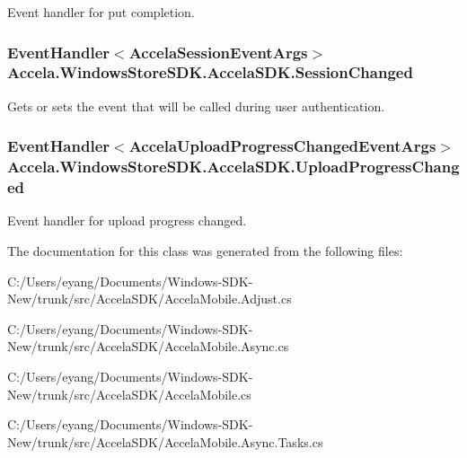 Event handler for put completion. 

\hypertarget{class_accela_1_1_windows_store_s_d_k_1_1_accela_s_d_k_a9217603b8d65f3b1424073df8c69dd1d}{
\subsubsection[{Session\+Changed}]{\setlength{\rightskip}{0pt plus 5cm}Event\+Handler$<${\bf Accela\+Session\+Event\+Args}$>$ Accela.\+Windows\+Store\+S\+D\+K.\+Accela\+S\+D\+K.\+Session\+Changed}}\label{class_accela_1_1_windows_store_s_d_k_1_1_accela_s_d_k_a9217603b8d65f3b1424073df8c69dd1d}


Gets or sets the event that will be called during user authentication. 

\hypertarget{class_accela_1_1_windows_store_s_d_k_1_1_accela_s_d_k_a724988be0528fd8b906ef1bdd49571d7}{
\subsubsection[{Upload\+Progress\+Changed}]{\setlength{\rightskip}{0pt plus 5cm}Event\+Handler$<${\bf Accela\+Upload\+Progress\+Changed\+Event\+Args}$>$ Accela.\+Windows\+Store\+S\+D\+K.\+Accela\+S\+D\+K.\+Upload\+Progress\+Changed}}\label{class_accela_1_1_windows_store_s_d_k_1_1_accela_s_d_k_a724988be0528fd8b906ef1bdd49571d7}


Event handler for upload progress changed. 



The documentation for this class was generated from the following files\+:\begin{DoxyCompactItemize}
\item 
C\+:/\+Users/eyang/\+Documents/\+Windows-\/\+S\+D\+K-\/\+New/trunk/src/\+Accela\+S\+D\+K/Accela\+Mobile.\+Adjust.\+cs\item 
C\+:/\+Users/eyang/\+Documents/\+Windows-\/\+S\+D\+K-\/\+New/trunk/src/\+Accela\+S\+D\+K/Accela\+Mobile.\+Async.\+cs\item 
C\+:/\+Users/eyang/\+Documents/\+Windows-\/\+S\+D\+K-\/\+New/trunk/src/\+Accela\+S\+D\+K/Accela\+Mobile.\+cs\item 
C\+:/\+Users/eyang/\+Documents/\+Windows-\/\+S\+D\+K-\/\+New/trunk/src/\+Accela\+S\+D\+K/Accela\+Mobile.\+Async.\+Tasks.\+cs\end{DoxyCompactItemize}
